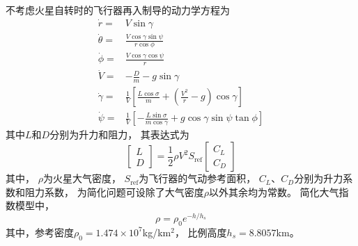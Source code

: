 不考虑火星自转时的飞行器再入制导的动力学方程为
\begin{align*}
    \dot{r} =& V\sin\gamma \\
    \dot{\theta} =& \frac{V \cos \gamma \sin \psi}{r \cos \phi} \\
    \dot{\phi} =& \frac{V \cos \gamma \cos \psi}{r} \\
    \dot{V} =& -\frac{D}{m} - g \sin \gamma \\
    \dot{\gamma} =& \frac{1}{V}\left[\frac{L\cos\sigma}{m}+\left(\frac{V^2}{r}-g\right)\cos\gamma\right] \\
    \dot{\psi} =& \frac{1}{V}\left[-\frac{L\sin\sigma}{m\cos\gamma}+g\cos\gamma\sin\psi\tan\phi\right]
\end{align*}
其中$L$和$D$分别为升力和阻力，
其表达式为
\begin{equation*}
    \left[\begin{matrix}
        L \\ D
    \end{matrix}\right]
    = \frac{1}{2}\rho V^2S_{\text{ref}}
    \left[\begin{matrix}
        C_L \\ C_D
    \end{matrix}\right]
\end{equation*}
其中，
$\rho$为火星大气密度，
$S_{\text{ref}}$为飞行器的气动参考面积，
$C_L$、$C_D$分别为升力系数和阻力系数，
为简化问题可设除了大气密度$\rho$以外其余均为常数。
简化大气指数模型中，
\[\rho=\rho_0e^{-h/h_s}\]
其中，参考密度$\rho_0=1.474\times10^7$kg/km$^2$，
比例高度$h_s=8.8057$km。
